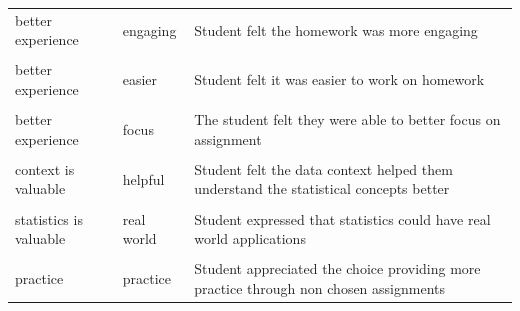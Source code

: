 \documentclass[
  letterpaper,
  DIV=11,
  numbers=noendperiod]{scrartcl}
\begin{document}
\begin{longtable}[t]{>{\raggedright\arraybackslash}p{1in}>{\raggedright\arraybackslash}p{1in}>{\raggedright\arraybackslash}p{4in}}
better experience & engaging & Student felt the homework was more engaging\\
\cellcolor{gray!10}{better experience} & \cellcolor{gray!10}{fun} & \cellcolor{gray!10}{Student expressed that the homework was more fun}\\
\addlinespace
better experience & easier & Student felt it was easier to work on homework\\
\cellcolor{gray!10}{better experience} & \cellcolor{gray!10}{challenge} & \cellcolor{gray!10}{Student felt the homework was challenging}\\
better experience & focus & The student felt they were able to better focus on assignment\\
\cellcolor{gray!10}{learn more about topic} & \cellcolor{gray!10}{learning} & \cellcolor{gray!10}{Student enjoyed learning about data context through assignment}\\
context is valuable & helpful & Student felt the data context helped them understand the statistical concepts better\\
\addlinespace
\cellcolor{gray!10}{statistics is valuable} & \cellcolor{gray!10}{meaningful} & \cellcolor{gray!10}{Student felt interesting data contexts helped make statistics meaningful instead of just being numbers}\\
statistics is valuable & real world & Student expressed that statistics could have real world applications\\
\cellcolor{gray!10}{choice is valuable} & \cellcolor{gray!10}{autonomy} & \cellcolor{gray!10}{Student appreciated having autonomy}\\
practice & practice & Student appreciated the choice providing more practice through non chosen assignments\\
\bottomrule

\end{longtable}

\newpage
\end{document}
